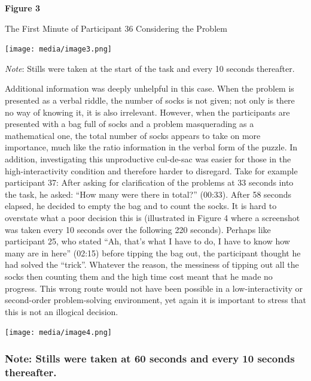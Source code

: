\textbf{Figure 3}

The First Minute of Participant 36 Considering the Problem

\texttt{[image: media/image3.png]}

\emph{Note}: Stills were taken at the start of the task and every 10
seconds thereafter.

Additional information was deeply unhelpful in this case. When the
problem is presented as a verbal riddle, the number of socks is not
given; not only is there no way of knowing it, it is also irrelevant.
However, when the participants are presented with a bag full of socks
and a problem masquerading as a mathematical one, the total number of
socks appears to take on more importance, much like the ratio
information in the verbal form of the puzzle. In addition, investigating
this unproductive cul-de-sac was easier for those in the
high-interactivity condition and therefore harder to disregard. Take for
example participant 37: After asking for clarification of the problems
at 33 seconds into the task, he asked: ``How many were there in total?''
(00:33). After 58 seconds elapsed, he decided to empty the bag and to
count the socks. It is hard to overstate what a poor decision this is
(illustrated in Figure 4 where a screenshot was taken every 10 seconds
over the following 220 seconds). Perhaps like participant 25, who stated
``Ah, that's what I have to do, I have to know how many are in here''
(02:15) before tipping the bag out, the participant thought he had
solved the ``trick''. Whatever the reason, the messiness of tipping out
all the socks then counting them and the high time cost meant that he
made no progress. This wrong route would not have been possible in a
low-interactivity or second-order problem-solving environment, yet again
it is important to stress that this is not an illogical decision.

\texttt{[image: media/image4.png]}

\hypertarget{note-stills-were-taken-at-60-seconds-and-every-10-seconds-thereafter.}{%
\subsubsection{Note: Stills were taken at 60 seconds and every 10
seconds
thereafter.}\label{note-stills-were-taken-at-60-seconds-and-every-10-seconds-thereafter.}}

\hypertarget{section-1}{%
\subsubsection{}\label{section-1}}

